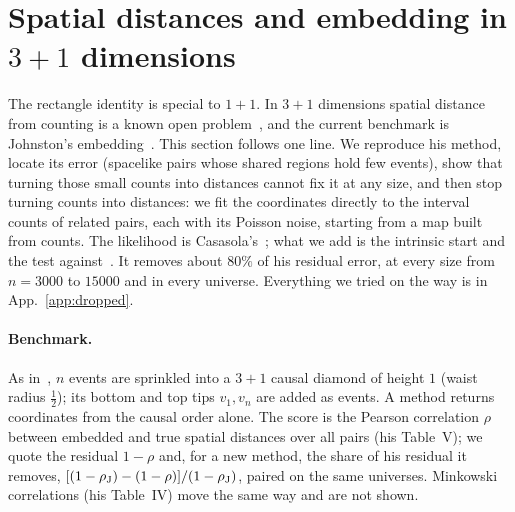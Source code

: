 \documentclass[11pt,a4paper]{article}
\begin{document}
\section{Spatial distances and embedding in $3+1$ dimensions}\label{sec:3p1}
The rectangle identity is special to $1+1$. In $3+1$ dimensions spatial distance from counting is a known open problem~\cite{Surya19}, and the current benchmark is Johnston's embedding~\cite{Johnston25}. This section follows one line. We reproduce his method, locate its error (spacelike pairs whose shared regions hold few events), show that turning those small counts into distances cannot fix it at any size, and then stop turning counts into distances: we fit the coordinates directly to the interval counts of related pairs, each with its Poisson noise, starting from a map built from counts. The likelihood is Casasola's~\cite{Casasola26}; what we add is the intrinsic start and the test against~\cite{Johnston25}. It removes about $80\%$ of his residual error, at every size from $n=3000$ to $15000$ and in every universe. Everything we tried on the way is in App.~\ref{app:dropped}.

\paragraph{Benchmark.} As in~\cite{Johnston25}, $n$ events are sprinkled into a $3+1$ causal diamond of height $1$ (waist radius $\tfrac12$); its bottom and top tips $v_1,v_n$ are added as events. A method returns coordinates from the causal order alone. The score is the Pearson correlation $\rho$ between embedded and true spatial distances over all pairs (his Table~V); we quote the residual $1-\rho$ and, for a new method, the share of his residual it removes, $[(1-\rho_{\rm J})-(1-\rho)]/(1-\rho_{\rm J})$, paired on the same universes. Minkowski correlations (his Table~IV) move the same way and are not shown.
\end{document}
